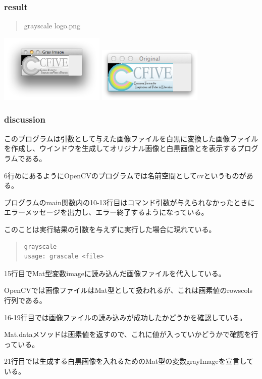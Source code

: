 \documentclass{jsarticle}
\begin{document}
\subsubsection{result}
\begin{quote}
grayscale logo.png 
\end{quote}
\includegraphics[width=5cm]{out_gray.png}
\includegraphics[width=5cm]{out_original.png}

\subsubsection{discussion}
このプログラムは引数として与えた画像ファイルを白黒に変換した画像ファイルを作成し、ウインドウを生成してオリジナル画像と白黒画像とを表示するプログラムである。  

6行めにあるようにOpenCVのプログラムでは名前空間としてcvというものがある。  

プログラムのmain関数内の10-13行目はコマンド引数が与えられなかったときにエラーメッセージを出力し、エラー終了するようになっている。  

このことは実行結果の引数を与えずに実行した場合に現れている。
\begin{quote}
\begin{verbatim}
grayscale  
usage: grascale <file>
\end{verbatim}
\end{quote}    
15行目でMat型変数imageに読み込んだ画像ファイルを代入している。  

OpenCVでは画像ファイルはMat型として扱われるが、これは画素値のrows\*cols行列である。  

16-19行目では画像ファイルの読み込みが成功したかどうかを確認している。  

Mat.dataメソッドは画素値を返すので、これに値が入っていかどうかで確認を行っている。  

21行目では生成する白黒画像を入れるためのMat型の変数grayImageを宣言している。  
\end{document}
